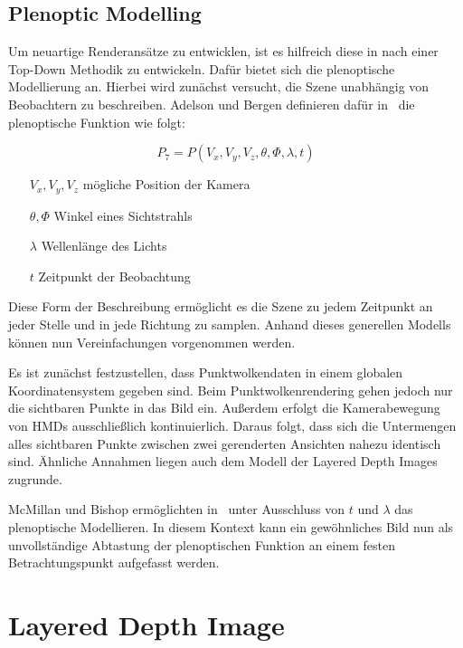 \documentclass[hyperref, beleg, german]{cgvpub}
\begin{document}
\section{Plenoptic Modelling}

Um neuartige Renderansätze zu entwicklen, ist es hilfreich diese in nach einer
Top-Down Methodik zu entwickeln. Dafür bietet sich die plenoptische Modellierung
an. Hierbei wird zunächst versucht, die Szene unabhängig von Beobachtern zu
beschreiben. Adelson und Bergen definieren dafür in~\cite{adelson1991plenoptic}
die plenoptische Funktion wie folgt:

\begin{equation}
	P_7 = P(V_x, V_y, V_z, \theta, \Phi, \lambda, t)
\end{equation}

\begin{itemize}
	\item[\( V_x, V_y, V_z \)] mögliche Position der Kamera
	\item[\( \theta, \Phi \)] Winkel eines Sichtstrahls
	\item[\( \lambda \)] Wellenlänge des Lichts
	\item[\( t \)] Zeitpunkt der Beobachtung
\end{itemize}

Diese Form der Beschreibung ermöglicht es die Szene zu jedem Zeitpunkt an jeder
Stelle und in jede Richtung zu samplen. Anhand dieses generellen Modells können
nun Vereinfachungen vorgenommen werden.

Es ist zunächst festzustellen, dass Punktwolkendaten in einem globalen
Koordinatensystem gegeben sind. Beim Punktwolkenrendering gehen jedoch nur die
sichtbaren Punkte in das Bild ein. Außerdem erfolgt die Kamerabewegung von HMDs
ausschließlich kontinuierlich. Daraus folgt, dass sich die Untermengen alles
sichtbaren Punkte zwischen zwei gerenderten Ansichten nahezu identisch sind.
Ähnliche Annahmen liegen auch dem Modell der Layered Depth Images zugrunde.

McMillan und Bishop ermöglichten in~\cite{mcmillan1995plenoptic} unter
Ausschluss von \( t \) und \( \lambda \) das plenoptische Modellieren. In
diesem Kontext kann ein gewöhnliches Bild nun als unvollständige Abtastung der
plenoptischen Funktion an einem festen Betrachtungspunkt aufgefasst werden.

\chapter{Layered Depth Image}
\end{document}
